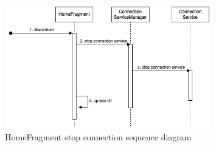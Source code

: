 \begin{figure}[H]
    \centering
    \includegraphics[width=0.8\textwidth]{diagrams/stop-connection-service-homefragment.drawio.png}
    \caption{HomeFragment stop connection sequence diagram}
    \label{fig:homefragment_stop_connection_diagram}
\end{figure}



